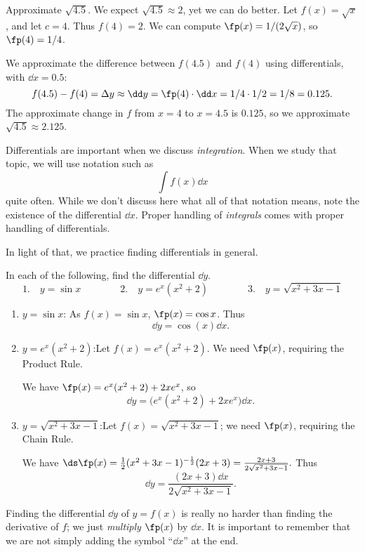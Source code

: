 \begin{example}\label{ex_diffal2}
Approximate $\sqrt{4.5}$.
\solution
We expect $\sqrt{4.5} \approx 2$, yet we can do better. Let $f(x) = \sqrt{x}$, and let $c=4$. Thus $f(4) = 2$. We can compute $\fp(x) = 1/(2\sqrt{x})$, so $\fp(4) = 1/4$. 

We approximate the difference between $f(4.5)$ and $f(4)$ using differentials, with $\dd x = 0.5$:
\[f(4.5)-f(4) = \Delta y \approx \dd y = \fp(4)\cdot \dd x = 1/4 \cdot 1/2 = 1/8 = 0.125.\]
The approximate change in $f$ from $x=4$ to $x=4.5$ is $0.125$, so we approximate $\sqrt{4.5} \approx 2.125$.
\end{example}

Differentials are important when we discuss \emph{integration}. When we study that topic, we will use notation such as
\[\int f(x)\dd x\]
quite often. While we don't discuss here what all of that notation means, note the existence of the differential $\dd x$. Proper handling of \emph{integrals} comes with proper handling of differentials. 

In light of that, we practice finding differentials in general.

\begin{example}\label{ex_diffal3}
In each of the following, find the differential $\dd y$.
\[
\text{1.}\quad y = \sin x\qquad\qquad
\text{2.}\quad y = e^x(x^2+2)\qquad\qquad
\text{3.}\quad y = \sqrt{x^2+3x-1}
\]
\solution
\begin{enumerate}
	\item	$y = \sin x$:	\quad As $f(x) = \sin x$, $\fp(x) = \cos x$. Thus
	\[\dd y = \cos(x)\dd x.\]
	\item	$y = e^x(x^2+2)$:\quad Let $f(x) = e^x(x^2+2)$. We need $\fp(x)$, requiring the Product Rule. 

We have $\fp(x) = e^x(x^2+2) + 2xe^x$, so
\[\dd y = \bigl(e^x(x^2+2) + 2xe^x\bigr)\dd x.\]

	\item	$y = \sqrt{x^2+3x-1}$:\quad	Let $f(x) = \sqrt{x^2+3x-1}$; we need $\fp(x)$, requiring the Chain Rule.

We have $\ds \fp(x) = \frac{1}{2}(x^2+3x-1)^{-\frac12}(2x+3) = \frac{2x+3}{2\sqrt{x^2+3x-1}}.$ Thus 
\[\dd y = \frac{(2x+3)\dd x}{2\sqrt{x^2+3x-1}}.\]
\end{enumerate}
\end{example}

Finding the differential $\dd y$ of $y=f(x)$ is really no harder than finding the derivative of $f$; we just \emph{multiply} $\fp(x)$ by $\dd x$. It is important to remember that we are not simply adding the symbol ``$\dd x$'' at the end.\bigskip

